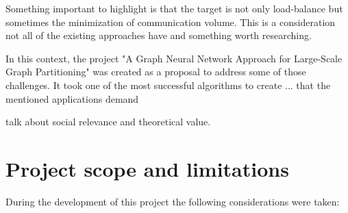 Something important to highlight is that the target is not only load-balance but sometimes the minimization of communication volume. This is a consideration not all of the existing approaches have and something worth researching.


In this context, the project "A Graph Neural Network Approach for Large-Scale Graph Partitioning" was created as a proposal to address some of those challenges. It took one of the most successful algorithms to create ...
that the mentioned applications demand

talk about social relevance and theoretical value.

\section{Project scope and limitations}
During the development of this project the following considerations were taken:
